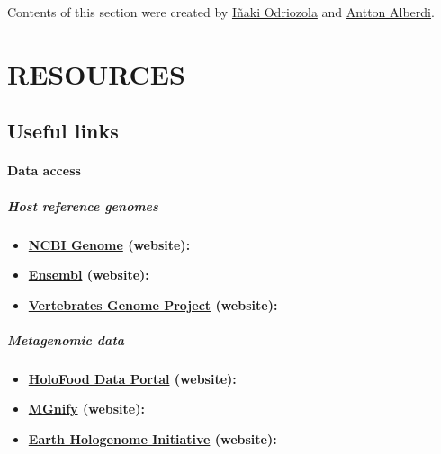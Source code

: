 \documentclass[
]{book}
\providecommand{\tightlist}{%
  \setlength{\itemsep}{0pt}\setlength{\parskip}{0pt}}
\begin{document}
Contents of this section were created by \protect\hyperlink{inaki-odriozola}{Iñaki Odriozola} and \protect\hyperlink{antton-alberdi}{Antton Alberdi}.

\hypertarget{part-resources}{%
\part{RESOURCES}\label{part-resources}}

\hypertarget{useful-links}{%
\chapter{Useful links}\label{useful-links}}

\hypertarget{links-data}{%
\subsection*{Data access}\label{links-data}}

\hypertarget{host-reference-genomes}{%
\subsubsection*{Host reference genomes}\label{host-reference-genomes}}

\begin{itemize}
\tightlist
\item
  \textbf{\href{https://www.ncbi.nlm.nih.gov/genome/}{NCBI Genome} (website):}
\item
  \textbf{\href{https://www.ensembl.org/index.html}{Ensembl} (website):}
\item
  \textbf{\href{https://vertebrategenomesproject.org/}{Vertebrates Genome Project} (website):}
\end{itemize}

\hypertarget{metagenomic-data}{%
\subsubsection*{Metagenomic data}\label{metagenomic-data}}

\begin{itemize}
\tightlist
\item
  \textbf{\href{https://www.holofooddata.org/}{HoloFood Data Portal} (website):}
\item
  \textbf{\href{https://www.ebi.ac.uk/metagenomics/}{MGnify} (website):}
\item
  \textbf{\href{http://www.earthhologenome.org/database.html}{Earth Hologenome Initiative} (website):}
\end{itemize}
\end{document}
